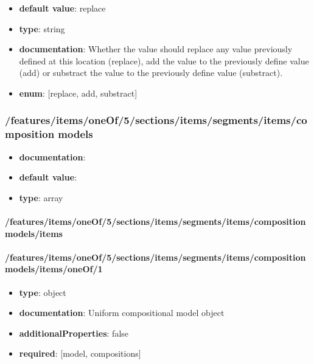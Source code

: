 \begin{itemize}\item {\bf default value}: replace
\item {\bf type}: string
\item {\bf documentation}: Whether the value should replace any value previously defined at this location (replace), add the value to the previously define value (add) or substract the value to the previously define value (substract).
\item {\bf enum}: [replace, add, substract]\end{itemize}\subsubsection{/features/items/oneOf/5/sections/items/segments/items/composition models}
\begin{itemize}\item {\bf documentation}: 
\item {\bf default value}: 
\item {\bf type}: array
\end{itemize}\paragraph{/features/items/oneOf/5/sections/items/segments/items/composition models/items}

\paragraph{/features/items/oneOf/5/sections/items/segments/items/composition models/items/oneOf/1}
\begin{itemize}\item {\bf type}: object
\item {\bf documentation}: Uniform compositional model object
\item {\bf additionalProperties}: false
\item {\bf required}: [model, compositions]\end{itemize}
